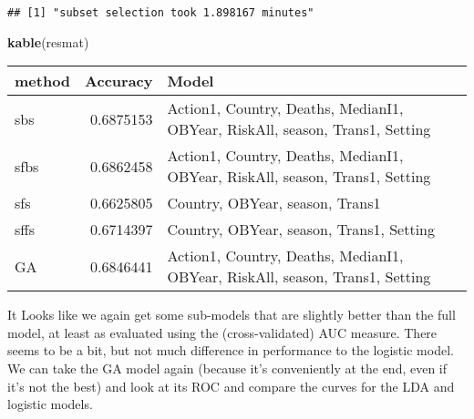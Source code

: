 \documentclass[]{article}
\newenvironment{Shaded}{\begin{snugshade}}{\end{snugshade}}
\newcommand{\CommentTok}[1]{\textcolor[rgb]{0.56,0.35,0.01}{\textit{#1}}}
\newcommand{\DataTypeTok}[1]{\textcolor[rgb]{0.13,0.29,0.53}{#1}}
\newcommand{\DecValTok}[1]{\textcolor[rgb]{0.00,0.00,0.81}{#1}}
\newcommand{\KeywordTok}[1]{\textcolor[rgb]{0.13,0.29,0.53}{\textbf{#1}}}
\newcommand{\NormalTok}[1]{#1}
\newcommand{\OperatorTok}[1]{\textcolor[rgb]{0.81,0.36,0.00}{\textbf{#1}}}
\newcommand{\StringTok}[1]{\textcolor[rgb]{0.31,0.60,0.02}{#1}}
\begin{document}
\begin{verbatim}
## [1] "subset selection took 1.898167 minutes"
\end{verbatim}

\begin{Shaded}
\begin{Highlighting}[]
\KeywordTok{kable}\NormalTok{(resmat)}
\end{Highlighting}
\end{Shaded}

\begin{longtable}[]{@{}lrl@{}}
\toprule
method & Accuracy & Model\tabularnewline
\midrule
\endhead
sbs & 0.6875153 & Action1, Country, Deaths, MedianI1, OBYear, RiskAll,
season, Trans1, Setting\tabularnewline
sfbs & 0.6862458 & Action1, Country, Deaths, MedianI1, OBYear, RiskAll,
season, Trans1, Setting\tabularnewline
sfs & 0.6625805 & Country, OBYear, season, Trans1\tabularnewline
sffs & 0.6714397 & Country, OBYear, season, Trans1,
Setting\tabularnewline
GA & 0.6846441 & Action1, Country, Deaths, MedianI1, OBYear, RiskAll,
season, Trans1, Setting\tabularnewline
\bottomrule
\end{longtable}

It Looks like we again get some sub-models that are slightly better than
the full model, at least as evaluated using the (cross-validated) AUC
measure. There seems to be a bit, but not much difference in performance
to the logistic model. We can take the GA model again (because it's
conveniently at the end, even if it's not the best) and look at its ROC
and compare the curves for the LDA and logistic models.

\begin{Shaded}
\end{Shaded}
\end{document}
